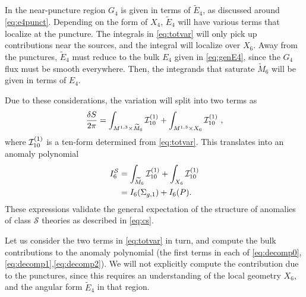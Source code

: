 \documentclass[a4paper,11pt]{article}
\newcommand{\ba}[1]{\begin{align} #1 \end{align} }
\def\CS{{\cal S}}
\def\CI{{\cal I}}
\begin{document}
In the near-puncture region $G_4$ is given in terms of $\widetilde{E}_4$, as discussed around \eqref{eq:e4punct}. Depending on the form of $X_4$, $\widetilde{E}_4$ will have various terms that localize at the puncture.   The integrals in \eqref{eq:totvar} will only pick up contributions near the sources, and the integral will localize over $X_6$. Away from the punctures, $\widetilde{E}_4$ must reduce to the bulk $E_4$ given in  \eqref{eq:genE4}, since the $G_4$ flux must be smooth everywhere. Then, the integrands that saturate $\widetilde{M}_6$ will be given in terms of $E_4$.

Due to these considerations, the variation will split into two terms as
	\ba{
	\frac{\delta S}{2\pi} = \int_{M^{1,3}\times \widetilde{M}_6} \CI_{10}^{(1)}+  \int_{M^{1,3}\times X_6} \CI_{10}^{(1)}\ , \label{eq:decomp0}
	}
where $\CI_{10}^{(1)}$ is a ten-form determined from \eqref{eq:totvar}. 
This translates into an anomaly polynomial 
\ba{
I_6^{\CS} &= \int_{\widetilde{M}_6} \CI_{10}^{(1)}  + \int_{X_6} \CI_{10}^{(1)} \label{eq:decomp1} \\
&=I_6(\Sigma_{g,1}) + I_6(P). \label{eq:decomp2}
}
These expressions validate the general expectation of the structure of anomalies of class $\mathcal{S}$ theories as described in \eqref{eq:cs}.  




	
Let us consider the two terms in \eqref{eq:totvar} in turn, and compute the bulk contributions to the anomaly polynomial (the first terms in each of \eqref{eq:decomp0},  \eqref{eq:decomp1},\eqref{eq:decomp2}). 
We will not explicitly compute the contribution due to the punctures, since this requires an understanding of the local geometry $X_6$, and the angular form $\widetilde{E}_4$ in that region. 
\end{document}
